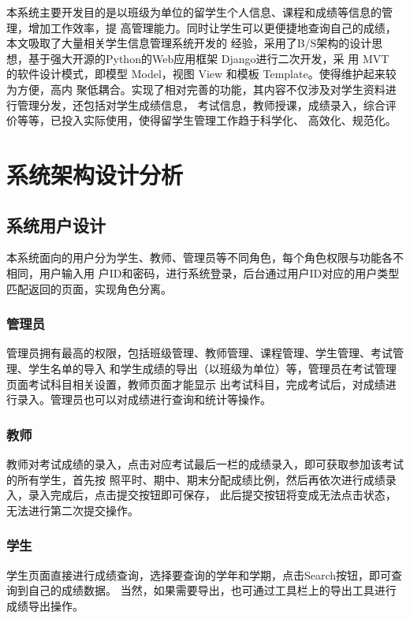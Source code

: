 \documentclass{ede}
\begin{document}
本系统主要开发目的是以班级为单位的留学生个人信息、课程和成绩等信息的管理，增加工作效率，提
高管理能力。同时让学生可以更便捷地查询自己的成绩，本文吸取了大量相关学生信息管理系统开发的
经验，采用了B/S架构的设计思想，基于强大开源的Python的Web应用框架 Django进行二次开发，采
用 MVT 的软件设计模式，即模型 Model，视图 View 和模板 Template。使得维护起来较为方便，高内
聚低耦合。实现了相对完善的功能，其内容不仅涉及对学生资料进行管理分发，还包括对学生成绩信息，
考试信息，教师授课，成绩录入，综合评价等等，已投入实际使用，使得留学生管理工作趋于科学化、
高效化、规范化。

\section{系统架构设计分析}

\subsection{系统用户设计}

本系统面向的用户分为学生、教师、管理员等不同角色，每个角色权限与功能各不相同，用户输入用
户ID和密码，进行系统登录，后台通过用户ID对应的用户类型匹配返回的页面，实现角色分离。

\subsubsection{管理员}

管理员拥有最高的权限，包括班级管理、教师管理、课程管理、学生管理、考试管理、学生名单的导入
和学生成绩的导出（以班级为单位）等，管理员在考试管理页面考试科目相关设置，教师页面才能显示
出考试科目，完成考试后，对成绩进行录入。管理员也可以对成绩进行查询和统计等操作。

\subsubsection{教师}

教师对考试成绩的录入，点击对应考试最后一栏的成绩录入，即可获取参加该考试的所有学生，首先按
照平时、期中、期末分配成绩比例，然后再依次进行成绩录入，录入完成后，点击提交按钮即可保存，
此后提交按钮将变成无法点击状态，无法进行第二次提交操作。

\subsubsection{学生}

学生页面直接进行成绩查询，选择要查询的学年和学期，点击Search按钮，即可查询到自己的成绩数据。
当然，如果需要导出，也可通过工具栏上的导出工具进行成绩导出操作。
\end{document}

